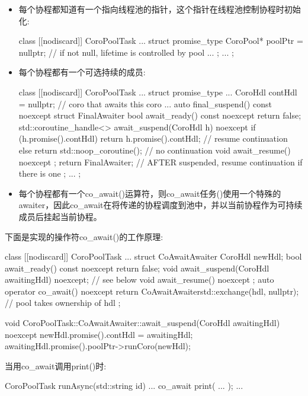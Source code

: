 \begin{itemize}
\item
每个协程都知道有一个指向线程池的指针，这个指针在线程池控制协程时初始化:

\begin{cpp}
class [[nodiscard]] CoroPoolTask
{
	...
	struct promise_type {
		CoroPool* poolPtr = nullptr; // if not null, lifetime is controlled by pool
		...
	};
	...
};
\end{cpp}

\item
每个协程都有一个可选持续的成员:

\begin{cpp}
class [[nodiscard]] CoroPoolTask
{
	...
	struct promise_type {
		...
		CoroHdl contHdl = nullptr; // coro that awaits this coro
		...
		auto final_suspend() const noexcept {
			struct FinalAwaiter {
				bool await_ready() const noexcept { return false; }
				std::coroutine_handle<> await_suspend(CoroHdl h) noexcept {
					if (h.promise().contHdl) {
						return h.promise().contHdl; // resume continuation
					}
					else {
						return std::noop_coroutine(); // no continuation
					}
				}
				void await_resume() noexcept {}
			};
			return FinalAwaiter{}; // AFTER suspended, resume continuation if there is one
		}
	};
	...
};
\end{cpp}

\item
每个协程都有一个co\_await()运算符，则co\_await任务()使用一个特殊的awaiter，因此co\_await在将传递的协程调度到池中，并以当前协程作为可持续成员后挂起当前协程。
\end{itemize}

下面是实现的操作符co\_await()的工作原理:

\begin{cpp}
class [[nodiscard]] CoroPoolTask
{
	...
	struct CoAwaitAwaiter {
		CoroHdl newHdl;
		bool await_ready() const noexcept { return false; }
		void await_suspend(CoroHdl awaitingHdl) noexcept; // see below
		void await_resume() noexcept {}
	};
	auto operator co_await() noexcept {
		return CoAwaitAwaiter{std::exchange(hdl, nullptr)}; // pool takes ownership of hdl
	}
};

void CoroPoolTask::CoAwaitAwaiter::await_suspend(CoroHdl awaitingHdl) noexcept
{
	newHdl.promise().contHdl = awaitingHdl;
	awaitingHdl.promise().poolPtr->runCoro(newHdl);
}
\end{cpp}

当用co\_await调用print()时:

\begin{cpp}
CoroPoolTask runAsync(std::string id)
{
	...
	co_await print( ... );
	...
}
\end{cpp}

